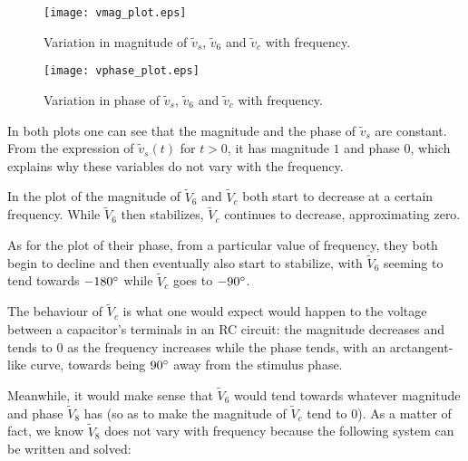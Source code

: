 \begin{figure}[H] \centering
\texttt{[image: vmag\_plot.eps]}
\caption{Variation in magnitude of $\tilde{v}_s$, $\tilde{v}_6$ and $\tilde{v}_c$ with frequency.}
\label{fig:magnitude}
\end{figure}


\begin{figure}[H] \centering
\texttt{[image: vphase\_plot.eps]}
\caption{Variation in phase of $\tilde{v}_s$, $\tilde{v}_6$ and $\tilde{v}_c$ with frequency.}
\label{fig:phase}
\end{figure}

In both plots one can see that the magnitude and the phase of $\tilde{v}_s$ are constant. From the expression of $\tilde{v}_s(t)$ for $t>0$, it has magnitude $1$ and phase $0$, which explains why these variables do not vary with the frequency.
\par
In the plot of the magnitude of $\tilde{V}_6$ and $\tilde{V}_c$ both start to decrease at a certain frequency. While $\tilde{V}_6$ then stabilizes, $\tilde{V}_c$ continues to decrease, approximating zero.
\par
As for the plot of their phase, from a particular value of frequency, they both begin to decline and then eventually also start to stabilize, with $\tilde{V}_6$ seeming to tend towards $-180\degree$ while $\tilde{V}_c$ goes to $-90\degree$.

The behaviour of $\tilde{V}_c$ is what one would expect would happen to the voltage between a capacitor's terminals in an RC circuit: the magnitude decreases and tends to 0 as the frequency increases while the phase tends, with an arctangent-like curve, towards being $90\degree$ away from the stimulus phase.

Meanwhile, it would make sense that $\tilde{V}_6$ would tend towards whatever magnitude and phase $\tilde{V}_8$ has (so as to make the magnitude of $\tilde{V}_c$ tend to $0$). As a matter of fact, we know $\tilde{V}_8$ does not vary with frequency because the following system can be written and solved:


